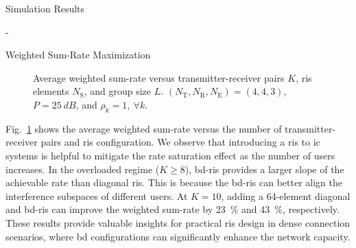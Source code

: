 \begin{section}{Simulation Results}
\begin{subsection}{-}
\begin{subsubsection}{Weighted Sum-Rate Maximization}
			\begin{figure}[H]
				\centering
				\resizebox{0.65\columnwidth}{!}{
					
				}
				\caption{Average weighted sum-rate versus transmitter-receiver pairs $K$, \gls{ris} elements $N_\mathrm{S}$, and group size $L$. $(N_\mathrm{T}, N_\mathrm{R}, N_\mathrm{E}) = (4, 4, 3)$, $P = \qty{25}{dB}$, and $\rho_k = 1, \ \forall k$.}
				\label{sm:ic_rate_user}
			\end{figure}

			Fig.~\ref{sm:ic_rate_user} shows the average weighted sum-rate versus the number of transmitter-receiver pairs and \gls{ris} configuration.
			We observe that introducing a \gls{ris} to \gls{ic} systems is helpful to mitigate the rate saturation effect as the number of users increases.
			In the overloaded regime ($K \ge 8$), \gls{bd}-\gls{ris} provides a larger slope of the achievable rate than diagonal \gls{ris}.
			This is because the \gls{bd}-\gls{ris} can better align the interference subspaces of different users.
			At $K=10$, adding a 64-element diagonal and \gls{bd}-\gls{ris} can improve the weighted sum-rate by \qty{23}{\percent} and \qty{43}{\percent}, respectively.
			These results provide valuable insights for practical \gls{ris} design in dense connection scenarios, where \gls{bd} configurations can significantly enhance the network capacity.
		\end{subsubsection}
	\end{subsection}
\end{section}

